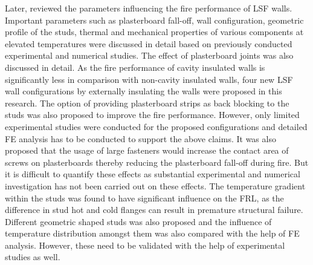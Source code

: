 Later, \citet{Kesawan2018} reviewed the parameters influencing the fire performance of LSF walls. Important parameters such as plasterboard fall-off, wall configuration, geometric profile of the studs, thermal and mechanical properties of various components at elevated temperatures were discussed in detail based on previously conducted experimental and numerical studies. The effect of plasterboard joints was also discussed in detail. As the fire performance of cavity insulated walls is significantly less in comparison with non-cavity insulated walls, four new LSF wall configurations by externally insulating the walls were proposed in this research. The option of providing plasterboard strips as back blocking to the studs was also proposed to improve the fire performance. However, only limited experimental studies were conducted for the proposed configurations and detailed FE analysis has to be conducted to support the above claims. It was also proposed that the usage of large fasteners would increase the contact area of screws on plasterboards thereby reducing the plasterboard fall-off during fire. But it is difficult to quantify these effects as substantial experimental and numerical investigation has not been carried out on these effects. The temperature gradient within the studs was found to have significant influence on the FRL, as the difference in stud hot and cold flanges can result in premature structural failure. Different geometric shaped studs was also proposed and the influence of temperature distribution amongst them was also compared with the help of FE analysis. However, these need to be validated with the help of experimental studies as well.

